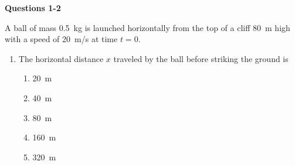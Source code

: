 \documentclass{../../oss-apphys}
\begin{document}
\genheader


\genmultidirections

\gengravity

\raggedcolumns
\begin{multicols}{2}

  \textbf{Questions 1-2}
  
  A ball of mass \SI{.5}{\kilo\gram} is launched horizontally from the top of a
  cliff \SI{80}{m} high with a speed of \SI{20}{m/s} at time $t=0$.
  \begin{center}
  \end{center}
  \begin{enumerate}[leftmargin=18pt]
  \item The horizontal distance $x$ traveled by the ball before striking the
    ground is
    \begin{enumerate}[noitemsep,topsep=0pt,leftmargin=18pt,label=(\Alph*)]
    \item\SI{20 }{\metre}
    \item\SI{40 }{\metre}
    \item\SI{80 }{\metre} 
    \item\SI{160}{\metre}
    \item\SI{320}{\metre}
    \end{enumerate}


\end{enumerate}
\end{multicols}
\end{document}
